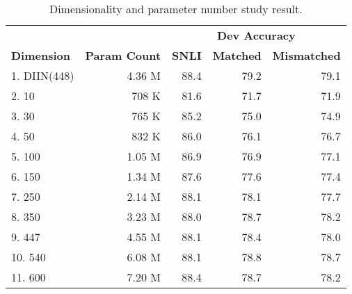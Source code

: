 \documentclass{article} \usepackage{iclr2018_conference,times}
\begin{document}
\begin{table*}
\centering
\small
\begin{tabular}{l r r r r}
\toprule
{} & \multicolumn{1}{c}{} &
\multicolumn{3}{c}{\bf Dev Accuracy} \\

{\bf Dimension} & {\bf Param Count} & {\bf SNLI}& {\bf Matched} & {\bf Mismatched}\\
\midrule
1. DIIN(448) & 4.36 M & 88.4 & 79.2 & 79.1 \\
\midrule
2. 10 & 708 K & 81.6 & 71.7 & 71.9 \\
3. 30 & 765 K & 85.2 & 75.0 & 74.9 \\
4. 50 & 832 K & 86.0 & 76.1 & 76.7 \\
5. 100 & 1.05 M & 86.9 & 76.9 & 77.1 \\
6. 150 & 1.34 M & 87.6 & 77.6 & 77.4 \\
7. 250 & 2.14 M & 88.1 & 78.1 & 77.7 \\
8. 350 & 3.23 M & 88.0 & 78.7 & 78.2 \\
9. 447 & 4.55 M & 88.1 & 78.4 & 78.0 \\
10. 540 & 6.08 M & 88.1 & 78.8 & 78.7 \\
11. 600 & 7.20 M &  88.4 & 78.7 & 78.2 \\

\bottomrule
\end{tabular}

\caption{Dimensionality and parameter number study result.\label{tab:dimensionality study}}
\end{table*}
\end{document}
